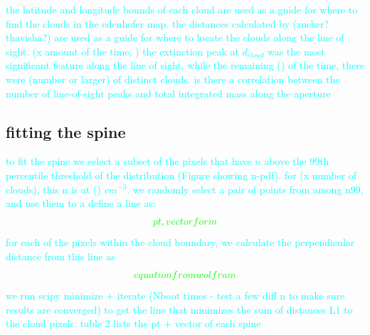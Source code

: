\documentclass[twocolumn]{aastex631}
\begin{document}
\textcolor{cyan}{the latitude and longitude bounds of each cloud are used as a guide for where to find the clouds in the edenhofer map. the distances calculated by (zucker? thavisha?) are used as a guide for where to locate the clouds along the line of sight. (x amount of the time, ) the extinction peak at $d_{cloud}$ was the most significant feature along the line of sight, while the remaining () of the time, there were (number or larger) of distinct clouds. is there a correlation between the number of line-of-sight peaks and total integrated mass along the aperture}


\subsection{fitting the spine}
\textcolor{cyan}{to fit the spine we select a subset of the pixels that have $n$ above the 99th percentile threshold of the distribution (Figure showing n-pdf). for (x number of clouds), this n is at () $cm^{-3}$. 
we randomly select a pair of points from among n99, and use them to a define a line as:
\begin{align}
    \textcolor{green}{pt, vector form}
\end{align}
for each of the pixels within the cloud boundary, we calculate the perpendicular distance from this line as 
\begin{align}
    \textcolor{green}{equation from wolfram}
\end{align}
we run scipy minimize + iterate (Nboot times - test a few diff n to make sure results are converged) to get the line that minimizes the sum of distances L1 to the cloud pixels. table 2 lists the pt + vector of each spine}
\end{document}
